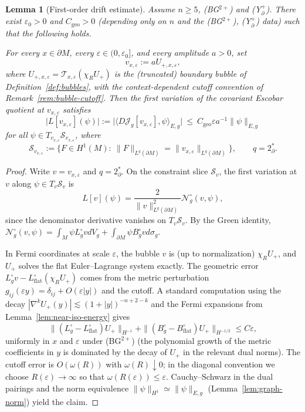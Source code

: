 \documentclass[11pt,reqno,a4paper]{amsart}
\numberwithin{equation}{section}
\theoremstyle{plain}
\newtheorem{lemma}[theorem]{Lemma}
\theoremstyle{remark}
\theoremstyle{plain}
\begin{document}
\begin{lemma}[First-order drift estimate]\label{lem:first-order-drift}
Assume $n\ge5$, \textup{(BG$^{2+}$)} and \textup{(Y$^+_{\partial}$)}. There exist $\varepsilon_0>0$ and $C_{\mathrm{geo}}>0$ (depending only on $n$ and the \textup{(BG$^{2+}$)}, \textup{(Y$^+_{\partial}$)} data) such that the following holds.

For every $x\in\partial M$, every $\varepsilon\in(0,\varepsilon_0]$, and every amplitude $a>0$, set
\[
v_{x,\varepsilon}:=aU_{+,x,\varepsilon},
\]
where $U_{+,x,\varepsilon}=\mathcal T_{x,\varepsilon}(\chi_RU_+)$ is the (truncated) boundary bubble
of Definition~\ref{def:bubbles}, with the context-dependent cutoff convention of
Remark~\ref{rem:bubble-cutoff}.
Then the first variation of the covariant Escobar quotient at $v_{x,\varepsilon}$ satisfies
\[
\big|L[v_{x,\varepsilon}](\psi)\big|
:=\big|\langle D\mathcal J_g[v_{x,\varepsilon}],\psi\rangle_{E,g}\big|
\ \le\ C_{\mathrm{geo}}\varepsilon a^{-1}\|\psi\|_{E,g}
\]
for all $\psi\in T_{v_{x,\varepsilon}}\mathcal S_{v_{x,\varepsilon}}$, where
\[
\mathcal S_{v_{x,\varepsilon}}:=\Big\{F\in H^1(M):\ \|F\|_{L^q(\partial M)}=\|v_{x,\varepsilon}\|_{L^q(\partial M)}\Big\},
\qquad q=2^*_\partial.
\]
\end{lemma}

\begin{proof}
Write $v=v_{x,\varepsilon}$ and $q=2^*_\partial$. On the constraint slice $\mathcal S_v$,
the first variation at $v$ along $\psi\in T_v\mathcal S_v$ is
\begin{equation}\label{eq:L-as-N}
L[v](\psi)=\frac{2}{\|v\|_{L^q(\partial M)}^2}\mathcal N_g^\circ(v,\psi),
\end{equation}
since the denominator derivative vanishes on $T_v\mathcal S_v$.
By the Green identity, $\mathcal N_g^\circ(v,\psi)=\int_M\psi L_g^\circ vdV_g+\int_{\partial M}\psi B_g^\circ vd\sigma_g$.

In Fermi coordinates at scale $\varepsilon$, the bubble $v$ is (up to normalization) $\chi_R U_+$,
and $U_+$ solves the flat Euler--Lagrange system exactly.
The geometric error $L_g^\circ v - L_{\mathrm{flat}}^\circ(\chi_RU_+)$ comes from the metric perturbation
$g_{ij}(\varepsilon y)=\delta_{ij}+O(\varepsilon|y|)$ and the cutoff.
A standard computation using the decay $|\nabla^k U_+(y)|\lesssim(1+|y|)^{-n+2-k}$
and the Fermi expansions from Lemma~\ref{lem:near-iso-energy} gives
\[
\|(L_g^\circ-L_{\mathrm{flat}}^\circ)U_+\|_{H^{-1}}
+\|(B_g^\circ-B_{\mathrm{flat}}^\circ)U_+\|_{H^{-1/2}}
\le C\varepsilon,
\]
uniformly in $x$ and $\varepsilon$ under \textup{(BG$^{2+}$)}
(the polynomial growth of the metric coefficients in $y$ is dominated by the decay of
$U_+$ in the relevant dual norms).
The cutoff error is $O(\omega(R))$ with $\omega(R)\downarrow0$;
in the diagonal convention we choose $R(\varepsilon)\to\infty$ so that $\omega(R(\varepsilon))\le\varepsilon$.
Cauchy--Schwarz in the dual pairings and the norm equivalence
$\|\psi\|_{H^1}\simeq\|\psi\|_{E,g}$ (Lemma~\ref{lem:graph-norm}) yield the claim.
\end{proof}
\end{document}
